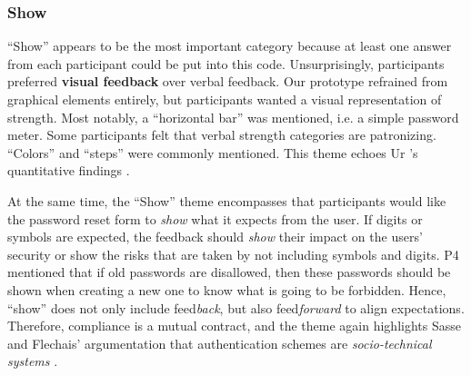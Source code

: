 \subsubsection{Show}
``Show'' appears to be the most important category because at least one answer from each participant could be put into this code. Unsurprisingly, participants preferred \textbf{visual feedback} over verbal feedback. Our prototype refrained from graphical elements entirely, but participants wanted a visual representation of strength. Most notably, a ``horizontal bar'' was mentioned, i.e. a simple password meter. Some participants felt that verbal strength categories are patronizing. ``Colors'' and ``steps'' were commonly mentioned. This theme echoes Ur \etal's quantitative findings \cite{Ur2017DataDrivenPWMeter}.

At the same time, the ``Show'' theme encompasses that participants would like the password reset form to \textit{show} what it expects from the user. If digits or symbols are expected, the feedback should \textit{show} their impact on the users' security or show the risks that are taken by not including symbols and digits. P4 mentioned that if old passwords are disallowed, then these passwords should be shown when creating a new one to know what is going to be forbidden. Hence, ``show'' does not only include feed\textit{back}, but also feed\textit{forward} to align expectations. Therefore, compliance is a mutual contract, and the theme again highlights Sasse and Flechais' argumentation that authentication schemes are \textit{socio-technical systems} \cite{Sasse2005UsableSecurityPosition}. 


